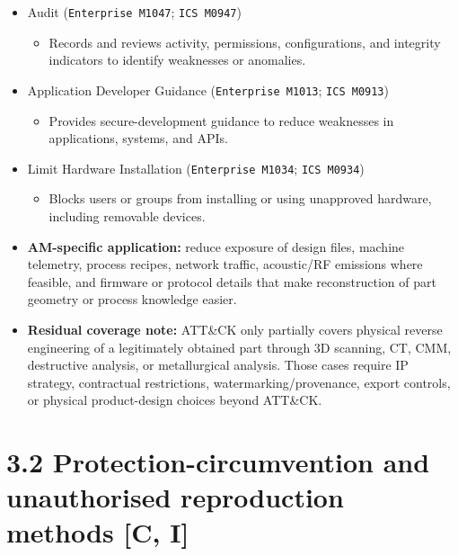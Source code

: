 \documentclass[10pt,a4paper,oneside]{report}
\begin{document}
\begin{itemize}
\begin{itemize}
\begin{itemize}
\item Requires devices and software processes to authenticate, especially for remote connections and API access.
\end{itemize}
\item Audit (\texttt{Enterprise M1047}; \texttt{ICS M0947})
\begin{itemize}
\item Records and reviews activity, permissions, configurations, and integrity indicators to identify weaknesses or anomalies.
\end{itemize}
\item Application Developer Guidance (\texttt{Enterprise M1013}; \texttt{ICS M0913})
\begin{itemize}
\item Provides secure-development guidance to reduce weaknesses in applications, systems, and APIs.
\end{itemize}
\item Limit Hardware Installation (\texttt{Enterprise M1034}; \texttt{ICS M0934})
\begin{itemize}
\item Blocks users or groups from installing or using unapproved hardware, including removable devices.
\end{itemize}
\end{itemize}
\end{itemize}

\begin{itemize}
\item \textbf{AM-specific application:} reduce exposure of design files, machine telemetry, process recipes, network traffic, acoustic/RF emissions where feasible, and firmware or protocol details that make reconstruction of part geometry or process knowledge easier.
\end{itemize}

\begin{itemize}
\item \textbf{Residual coverage note:} ATT\&CK only partially covers physical reverse engineering of a legitimately obtained part through 3D scanning, CT, CMM, destructive analysis, or metallurgical analysis. Those cases require IP strategy, contractual restrictions, watermarking/provenance, export controls, or physical product-design choices beyond ATT\&CK.
\end{itemize}


\section{3.2 Protection-circumvention and unauthorised reproduction methods [C, I]}
\end{document}
